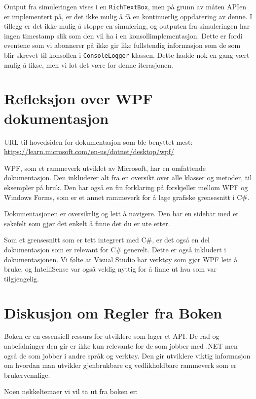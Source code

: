 \documentclass[12pt]{article}
\begin{document}
Output fra simuleringen vises i en \texttt{RichTextBox}, men på grunn av måten APIen er implementert på, 
er det ikke mulig å få en kontinuerlig oppdatering av denne. I tillegg er det ikke mulig å stoppe en simulering,
og outputen fra simuleringen har ingen timestamp slik som den vil ha i en konsollimplementasjon. Dette er fordi eventene
som vi abonnerer på ikke gir like fullstendig informasjon som de som blir skrevet til konsollen i \texttt{ConsoleLogger} 
klassen. Dette hadde nok en gang vært mulig å fikse, men vi lot det være for denne iterasjonen.

\section{Refleksjon over WPF dokumentasjon}
URL til hovedsiden for dokumentasjon som ble benyttet mest: \url{https://learn.microsoft.com/en-us/dotnet/desktop/wpf/}

WPF, som et rammeverk utviklet av Microsoft, har en omfattende dokumentasjon. Den inkluderer
alt fra en oversikt over alle klasser og metoder, til eksempler på bruk. Den har også en fin
forklaring på forskjeller mellom WPF og Windows Forms, som er et annet rammeverk for å lage
grafiske grensesnitt i C\#.

Dokumentasjonen er oversiktlig og lett å navigere. Den har en sidebar med et søkefelt som gjør det
enkelt å finne det du er ute etter.

Som et grensesnitt som er tett integrert med C\#, er det også en del dokumentasjon som er relevant
for C\# generelt. Dette er også inkludert i dokumentasjonen. Vi følte at Visual Studio har verktøy
som gjør WPF lett å bruke, og IntelliSense var også veldig nyttig for å finne ut hva som var tilgjengelig.

\section{Diskusjon om Regler fra Boken}

Boken er en essensiell ressurs for utviklere som lager et API. De råd og anbefalninger den gir er ikke kun 
relevante for de som jobber med .NET men også de som jobber i andre språk og verktøy. Den gir utviklere viktig
informasjon om hvordan man utvikler gjenbrukbare og vedlikholdbare rammeverk som er brukervennlige. 

Noen nøkkeltemaer vi vil ta ut fra boken er:
\end{document}
